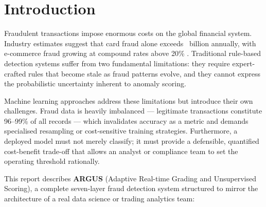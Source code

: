 ﻿%

\section{Introduction}
\label{sec:intro}

Fraudulent transactions impose enormous costs on the global financial system.
Industry estimates suggest that card fraud alone exceeds \ billion annually,
with e-commerce fraud growing at compound rates above 20\% \citep{ieeecisFraud2019}.
Traditional rule-based detection systems suffer from two fundamental limitations:
they require expert-crafted rules that become stale as fraud patterns evolve,
and they cannot express the probabilistic uncertainty inherent to anomaly scoring.

Machine learning approaches address these limitations but introduce their own
challenges. Fraud data is heavily imbalanced --- legitimate transactions
constitute 96--99\% of all records --- which invalidates accuracy as a metric
and demands specialised resampling or cost-sensitive training strategies.
Furthermore, a deployed model must not merely classify; it must provide
a defensible, quantified cost-benefit trade-off that allows an analyst or
compliance team to set the operating threshold rationally.

This report describes \textbf{ARGUS} (Adaptive Real-time Grading and
Unsupervised Scoring), a complete seven-layer fraud detection system
structured to mirror the architecture of a real data science or trading
analytics team:


